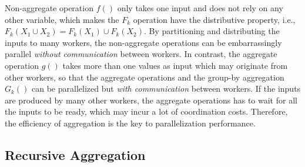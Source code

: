 
Non-aggregate operation $f()$ only takes one input and does not rely on any other variable, which makes the $F_k$ operation have the distributive property, i.e., $F_k(X_1 \cup X_2)=F_k(X_1) \cup F_k(X_2)$. By partitioning and distributing the inputs to many workers, the non-aggregate operations can be embarrassingly parallel \emph{without communication} between workers. In contrast, the aggregate operation $g()$ takes more than one values as input which may originate from other workers, so that the aggregate operations and the group-by aggregation $G_k()$ can be parallelized but \emph{with communication} between workers. If the inputs are produced by many other workers, the aggregate operations has to wait for all the inputs to be ready, which may incur a lot of coordination costs. Therefore, the efficiency of aggregation is the key to parallelization performance.




\subsection{Recursive Aggregation}


